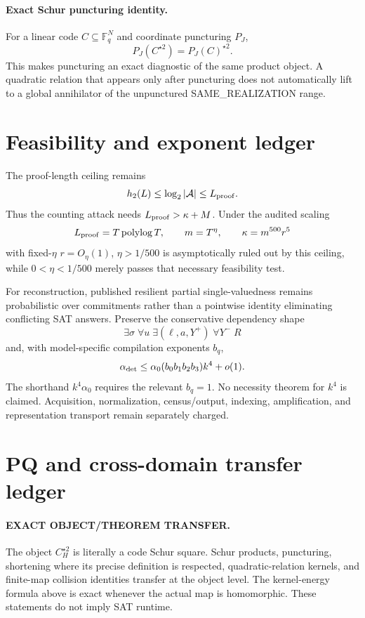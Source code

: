 \documentclass[11pt]{article}
\begin{document}
\paragraph{Exact Schur puncturing identity.}
For a linear code \(C\subseteq\mathbb F_q^N\) and coordinate puncturing \(P_J\),
\[
\boxed{
P_J(C^{\star2})=P_J(C)^{\star2}.
}
\]
This makes puncturing an exact diagnostic of the same product object. A quadratic relation that appears only after puncturing does not automatically lift to a global annihilator of the unpunctured SAME\_REALIZATION range.

\section*{Feasibility and exponent ledger}
The proof-length ceiling remains
\[
h_2(L)\le\log_2|\mathcal A|\le L_{\rm proof}.
\]
Thus the counting attack needs \(L_{\rm proof}>\kappa+M\). Under the audited scaling
\[
L_{\rm proof}=T\operatorname{polylog}T,\qquad
m=T^\eta,\qquad
\kappa=m^{500}r^5
\]
with fixed-\(\eta\) \(r=O_\eta(1)\), \(\eta>1/500\) is asymptotically ruled out by this ceiling, while \(0<\eta<1/500\) merely passes that necessary feasibility test.

For reconstruction, published resilient partial single-valuedness remains probabilistic over commitments rather than a pointwise identity eliminating conflicting SAT answers. Preserve the conservative dependency shape
\[
\exists\sigma\;\forall u\;\exists(\ell,a,Y^+)\;\forall Y^-\;R
\]
and, with model-specific compilation exponents \(b_q\),
\[
\alpha_{\rm det}
\le
\alpha_0(b_0b_1b_2b_3)k^4+o(1).
\]
The shorthand \(k^4\alpha_0\) requires the relevant \(b_q=1\). No necessity theorem for \(k^4\) is claimed. Acquisition, normalization, census/output, indexing, amplification, and representation transport remain separately charged.

\section*{PQ and cross-domain transfer ledger}
\paragraph{EXACT OBJECT/THEOREM TRANSFER.}
The object \(C_H^{\star2}\) is literally a code Schur square. Schur products, puncturing, shortening where its precise definition is respected, quadratic-relation kernels, and finite-map collision identities transfer at the object level. The kernel-energy formula above is exact whenever the actual map is homomorphic. These statements do not imply SAT runtime.
\end{document}
